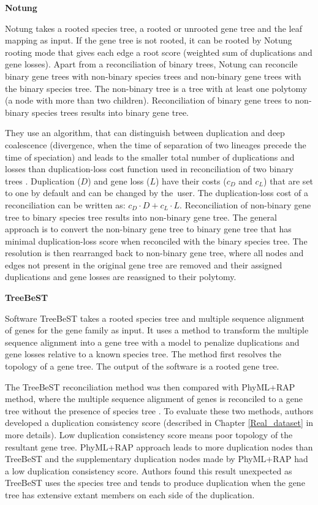 \noindent \textbf{Notung}  

Notung \cite{notung} takes a rooted species tree, a rooted or unrooted gene tree and the leaf mapping as input. If the gene tree is not rooted, it can be rooted by Notung rooting mode that gives each edge a root score (weighted sum of duplications and gene losses). Apart from a reconciliation of binary trees, Notung can reconcile binary gene trees with non-binary species trees and non-binary gene trees with the binary species tree. The non-binary tree is a tree with at least one polytomy (a node with more than two children). Reconciliation of binary gene trees to non-binary species trees results into binary gene tree.

They use an algorithm, that can distinguish between duplication and deep coalescence (divergence, when the time of separation of two lineages precede the time of speciation) and leads to the smaller total number of duplications and losses than duplication-loss cost function used in reconciliation of two binary trees \cite{vernot}. Duplication ($D$) and gene loss ($L$) have their costs ($c_D$ and $c_L$) that are set to one by default and can be changed by the~user. The duplication-loss cost of a reconciliation can be written as: $c_D \cdot D+c_L \cdot L$. Reconciliation of non-binary gene tree to binary species tree results into non-binary gene tree. The general approach is to convert the non-binary gene tree to binary gene tree that has minimal duplication-loss score when reconciled with the binary species tree. The resolution is then rearranged back to non-binary gene tree, where all nodes and edges not present in the original gene tree are removed and their assigned duplications and gene losses are reassigned to their polytomy.

\noindent \textbf{TreeBeST} 

Software TreeBeST \cite{treebest_online} takes a rooted species tree and multiple sequence alignment of genes for the gene family as input. It uses a method to transform the multiple sequence alignment into a gene tree with a model to penalize duplications and gene losses relative to a known species tree. The method first resolves the topology of a gene tree. The output of the software is a rooted gene tree.

The TreeBeST reconciliation method was then compared with PhyML+RAP method, where the multiple sequence alignment of genes is reconciled to a gene tree without the presence of species tree \cite{treebest}. To evaluate these two methods, authors developed a duplication consistency score (described in Chapter \ref{Real_dataset} in more details). Low duplication consistency score means poor topology of the resultant gene tree. PhyML+RAP approach leads to more duplication nodes than TreeBeST and the supplementary duplication nodes made by PhyML+RAP had a low duplication consistency score. Authors found this result unexpected as TreeBeST uses the species tree and tends to produce duplication when the gene tree has extensive extant members on each side of the duplication.

